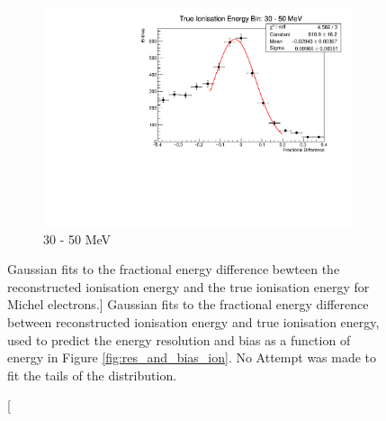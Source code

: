 \begin{figure}
\begin{subfigure}[b]{0.49\textwidth}
		\includegraphics[width=\textwidth]{figures/ion_res_30.pdf}
		\caption {30 - 50 MeV}
	\end{subfigure}

	\caption
	[Gaussian fits to the fractional energy difference bewteen the reconstructed
	ionisation energy and the true ionisation energy for Michel electrons.]
	{Gaussian fits to the fractional energy difference between 
		reconstructed ionisation energy and true ionisation energy, used to predict 
		the energy resolution and bias as a function of energy in Figure 
		\ref{fig:res_and_bias_ion}. No Attempt was made to fit the tails of the
		distribution.}
	\label{fig:ionisation_fits}

\end{figure}

\newpage
